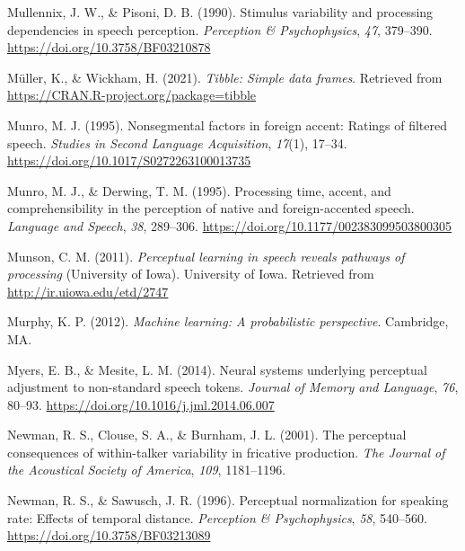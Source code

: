 \documentclass[
  11pt,
  english,
  man,floatsintext]{apa6}
\newlength{\cslhangindent}
\newlength{\cslentryspacingunit} %
\newenvironment{CSLReferences}[2] %
 {%
  \setlength{\parindent}{0pt}
  \ifodd #1
  \let\oldpar\par
  \def\par{\hangindent=\cslhangindent\oldpar}
  \fi
  \setlength{\parskip}{#2\cslentryspacingunit}
 }%
 {}
\begin{document}
\begin{CSLReferences}{1}{0}
\leavevmode{}%
Mullennix, J. W., \& Pisoni, D. B. (1990). Stimulus variability and processing dependencies in speech perception. \emph{Perception \& Psychophysics}, \emph{47}, 379--390. \url{https://doi.org/10.3758/BF03210878}

\leavevmode{}%
Müller, K., \& Wickham, H. (2021). \emph{Tibble: Simple data frames}. Retrieved from \url{https://CRAN.R-project.org/package=tibble}

\leavevmode{}%
Munro, M. J. (1995). Nonsegmental factors in foreign accent: Ratings of filtered speech. \emph{Studies in Second Language Acquisition}, \emph{17}(1), 17--34. \url{https://doi.org/10.1017/S0272263100013735}

\leavevmode{}%
Munro, M. J., \& Derwing, T. M. (1995). Processing time, accent, and comprehensibility in the perception of native and foreign-accented speech. \emph{Language and Speech}, \emph{38}, 289--306. \url{https://doi.org/10.1177/002383099503800305}

\leavevmode{}%
Munson, C. M. (2011). \emph{Perceptual learning in speech reveals pathways of processing} (University of Iowa). University of Iowa. Retrieved from \url{http://ir.uiowa.edu/etd/2747}

\leavevmode{}%
Murphy, K. P. (2012). \emph{Machine learning: A probabilistic perspective}. Cambridge, MA.

\leavevmode{}%
Myers, E. B., \& Mesite, L. M. (2014). Neural systems underlying perceptual adjustment to non-standard speech tokens. \emph{Journal of Memory and Language}, \emph{76}, 80--93. \url{https://doi.org/10.1016/j.jml.2014.06.007}

\leavevmode{}%
Newman, R. S., Clouse, S. A., \& Burnham, J. L. (2001). The perceptual consequences of within-talker variability in fricative production. \emph{The Journal of the Acoustical Society of America}, \emph{109}, 1181--1196.

\leavevmode{}%
Newman, R. S., \& Sawusch, J. R. (1996). Perceptual normalization for speaking rate: Effects of temporal distance. \emph{Perception \& Psychophysics}, \emph{58}, 540--560. \url{https://doi.org/10.3758/BF03213089}


\end{CSLReferences}
\end{document}
